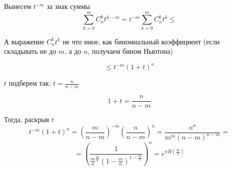 Вынесем $ t^{-m} $ за знак суммы
$$
\sum\limits_{k=0}^{m} C_n^k t^{k-m}
= t^{-m} \sum\limits_{k=0}^{m} C_n^k t^{k} \le
$$

А выражение $ C_n^k t^{k} $ не что иное, как биномиальный коэффициент (если складывать не до
$ m $, а до $ n $, получаем бином Ньютона)

$$
\le t^{-m} (1 + t)^{n}
$$

$ t $ подберем так: $t = \frac{n}{n-m}$ 

$$
1+t = \frac{n}{n-m} 
$$

Тогда, раскрыв $ t $
$$
t^{-m} (1 + t)^{n} = 
\left( 
\frac{m}{n-m}
\right)^{-m}
\left( 
\frac{n}{n-m}
\right)^{n} = 
\frac{ n^{n}
}{ m^{m} (n-m)^{n-m}
} =
$$
$$
= \left(
\frac{1}{ \frac{m}{n}^{\frac{m}{n}} 
(1-\frac{m}{n})^{1 - \frac{m}{n}} }
\right)^{n} =
e^{nH(\frac{m}{n})}
$$







